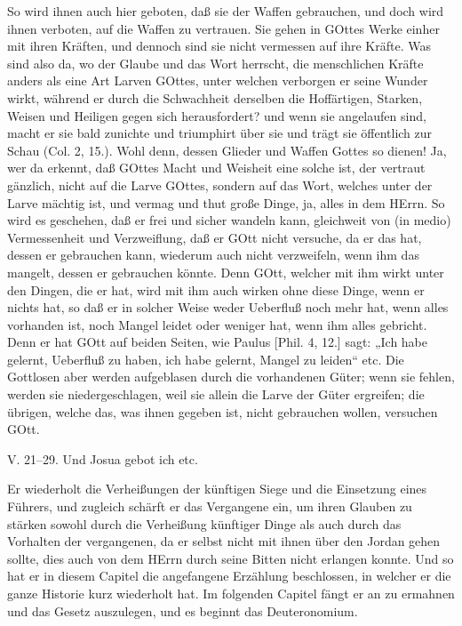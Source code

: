 So wird ihnen auch hier geboten, daß sie der Waffen gebrauchen, und doch wird ihnen verboten, auf die Waffen zu vertrauen. Sie gehen in GOttes Werke einher mit ihren Kräften, und dennoch sind sie nicht vermessen auf ihre Kräfte. Was sind also da, wo der Glaube und das Wort herrscht, die menschlichen Kräfte anders als eine Art Larven GOttes, unter welchen verborgen er seine Wunder wirkt, während er durch die Schwachheit derselben die Hoffärtigen, Starken, Weisen und Heiligen gegen sich herausfordert? und wenn sie angelaufen sind, macht er sie bald zunichte und triumphirt über sie und trägt sie öffentlich zur Schau (Col. 2, 15.). Wohl denn, dessen Glieder und Waffen Gottes so dienen! Ja, wer da erkennt, daß GOttes Macht und Weisheit eine solche ist, der vertraut gänzlich, nicht auf die Larve GOttes, sondern auf das Wort, welches unter der Larve mächtig ist, und vermag und thut große Dinge, ja, alles in dem HErrn. So wird es geschehen, daß er frei und sicher wandeln kann, gleichweit von (in medio) Vermessenheit und Verzweiflung, daß er GOtt nicht versuche, da er das hat, dessen er gebrauchen kann, wiederum auch nicht verzweifeln, wenn ihm das mangelt, dessen er gebrauchen könnte. Denn GOtt, welcher mit ihm wirkt unter den Dingen, die er hat, wird mit ihm auch wirken ohne diese Dinge, wenn er nichts hat, so daß er in solcher Weise weder Ueberfluß noch mehr hat, wenn alles vorhanden ist, noch Mangel leidet oder weniger hat, wenn ihm alles gebricht. Denn er hat GOtt auf beiden Seiten, wie Paulus [Phil. 4, 12.] sagt: „Ich habe gelernt, Ueberfluß zu haben, ich habe gelernt, Mangel zu leiden“ etc. Die Gottlosen aber werden aufgeblasen durch die vorhandenen Güter; wenn sie fehlen, werden sie niedergeschlagen, weil sie allein die Larve der Güter ergreifen; die übrigen, welche das, was ihnen gegeben ist, nicht gebrauchen wollen, versuchen GOtt.

\begin{schriftzitat}
V. 21–29. Und Josua gebot ich etc.
\end{schriftzitat}

Er wiederholt die Verheißungen der künftigen Siege und die Einsetzung eines Führers, und zugleich schärft er das Vergangene ein, um ihren Glauben zu stärken sowohl durch die Verheißung künftiger Dinge als auch durch das Vorhalten der vergangenen, da er selbst nicht mit ihnen über den Jordan gehen sollte, dies auch von dem HErrn durch seine Bitten nicht erlangen konnte. Und so hat er in diesem Capitel die angefangene Erzählung beschlossen, in welcher er die ganze Historie kurz wiederholt hat. Im folgenden Capitel fängt er an zu ermahnen und das Gesetz auszulegen, und es beginnt das Deuteronomium.

